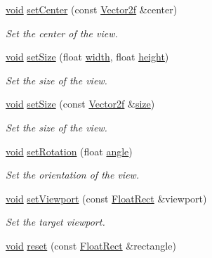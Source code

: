 \begin{DoxyCompactItemize}
\hyperlink{glutf90_8h_ac778d6f63f1aaf8ebda0ce6ac821b56e}{void} \hyperlink{classsf_1_1_view_ab0296b03793e0873e6ae9e15311f3e78}{set\-Center} (const \hyperlink{namespacesf_acf03098c2577b869e2fa6836cc48f1a0}{Vector2f} \&center)
\begin{DoxyCompactList}\small\item\em Set the center of the view. \end{DoxyCompactList}\item 
\hyperlink{glutf90_8h_ac778d6f63f1aaf8ebda0ce6ac821b56e}{void} \hyperlink{classsf_1_1_view_a9525b73fe9fbaceb9568faf56b399dab}{set\-Size} (float \hyperlink{gl3_8h_a9d14ddc31c6c8b61f3fe3679ab976133}{width}, float \hyperlink{gl3_8h_a67001679ebf2bb0ba972db4d29c6550c}{height})
\begin{DoxyCompactList}\small\item\em Set the size of the view. \end{DoxyCompactList}\item 
\hyperlink{glutf90_8h_ac778d6f63f1aaf8ebda0ce6ac821b56e}{void} \hyperlink{classsf_1_1_view_a9e08d471ce21aa0e69ce55ff9de66d29}{set\-Size} (const \hyperlink{namespacesf_acf03098c2577b869e2fa6836cc48f1a0}{Vector2f} \&\hyperlink{gl3_8h_a79ef9eb3e59c4bb34c4b9fbeb8d28ff7}{size})
\begin{DoxyCompactList}\small\item\em Set the size of the view. \end{DoxyCompactList}\item 
\hyperlink{glutf90_8h_ac778d6f63f1aaf8ebda0ce6ac821b56e}{void} \hyperlink{classsf_1_1_view_a24d0503c9c51f5ef5918612786d325c1}{set\-Rotation} (float \hyperlink{_vector3_8h_abd17f37dc7bb5b2bd9a569193ebcdda4}{angle})
\begin{DoxyCompactList}\small\item\em Set the orientation of the view. \end{DoxyCompactList}\item 
\hyperlink{glutf90_8h_ac778d6f63f1aaf8ebda0ce6ac821b56e}{void} \hyperlink{classsf_1_1_view_a8eaec46b7d332fe834f016d0187d4b4a}{set\-Viewport} (const \hyperlink{namespacesf_aed4e58f586b2eed2621c0365d0b7554e}{Float\-Rect} \&viewport)
\begin{DoxyCompactList}\small\item\em Set the target viewport. \end{DoxyCompactList}\item 
\hyperlink{glutf90_8h_ac778d6f63f1aaf8ebda0ce6ac821b56e}{void} \hyperlink{classsf_1_1_view_ac95b636eafab3922b7e8304fb6c00d7d}{reset} (const \hyperlink{namespacesf_aed4e58f586b2eed2621c0365d0b7554e}{Float\-Rect} \&rectangle)

\end{DoxyCompactItemize}
